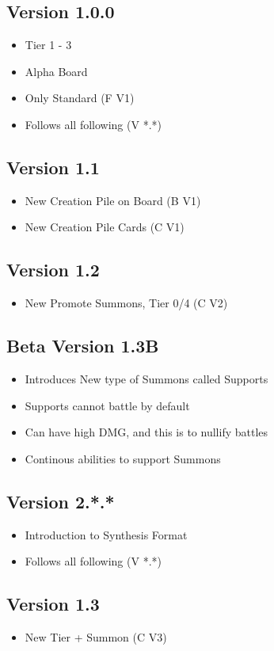 \documentclass[12pt, letterpaper]{article}
\begin{document}
\subsection{Version 1.0.0}
\begin{itemize}
    \item Tier 1 - 3
    \item Alpha Board
    \item Only Standard (F V1)
    \item Follows all following (V *.*)
\end{itemize}
%
\subsection{Version 1.1}
\begin{itemize}
    \item New Creation Pile on Board (B V1)
    \item New Creation Pile Cards (C V1)
\end{itemize}
%
\subsection{Version 1.2}
\begin{itemize}
    \item New Promote Summons, Tier 0/4 (C V2)
\end{itemize}
%
\subsection{Beta Version 1.3B}
\begin{itemize}
    \item Introduces New type of Summons called Supports
    \item Supports cannot battle by default
    \item Can have high DMG, and this is to nullify battles 
    \item Continous abilities to support Summons
\end{itemize}
%
\subsection{Version 2.*.*}
\begin{itemize}
    \item Introduction to Synthesis Format 
    \item Follows all following (V *.*)
\end{itemize}
%
\subsection{Version 1.3}
\begin{itemize}
    \item New Tier + Summon (C V3)
\end{itemize}
%
\end{document}
